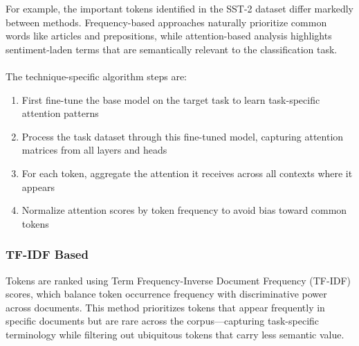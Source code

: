\documentclass[twocolumn]{article}
\begin{document}
For example, the important tokens identified in the SST-2 dataset differ markedly between methods. Frequency-based approaches naturally prioritize common words like articles and prepositions, while attention-based analysis highlights sentiment-laden terms that are semantically relevant to the classification task.
\\ \\
The technique-specific algorithm steps are:
\begin{enumerate}
    \item First fine-tune the base model on the target task to learn task-specific attention patterns
    \item Process the task dataset through this fine-tuned model, capturing attention matrices from all layers and heads
    \item For each token, aggregate the attention it receives across all contexts where it appears
    \item Normalize attention scores by token frequency to avoid bias toward common tokens
\end{enumerate}
\subsubsection{TF-IDF Based}
Tokens are ranked using Term Frequency-Inverse Document Frequency (TF-IDF) scores, which balance token occurrence frequency with discriminative power across documents. This method prioritizes tokens that appear frequently in specific documents but are rare across the corpus—capturing task-specific terminology while filtering out ubiquitous tokens that carry less semantic value.
\end{document}
